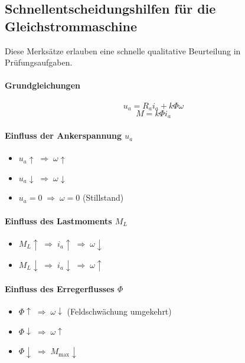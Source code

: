 \subsection{Schnellentscheidungshilfen für die Gleichstrommaschine}

Diese Merksätze erlauben eine schnelle qualitative Beurteilung in Prüfungsaufgaben.

\paragraph{Grundgleichungen}

\[
u_a = R_a i_a + k\Phi \omega
\]
\[
M = k\Phi i_a
\]

\paragraph{Einfluss der Ankerspannung $u_a$}

\begin{itemize}
\item $u_a \uparrow \;\Rightarrow\; \omega \uparrow$
\item $u_a \downarrow \;\Rightarrow\; \omega \downarrow$
\item $u_a = 0 \;\Rightarrow\; \omega = 0$ (Stillstand)
\end{itemize}

\paragraph{Einfluss des Lastmoments $M_L$}

\begin{itemize}
\item $M_L \uparrow \;\Rightarrow\; i_a \uparrow \;\Rightarrow\; \omega \downarrow$
\item $M_L \downarrow \;\Rightarrow\; i_a \downarrow \;\Rightarrow\; \omega \uparrow$
\end{itemize}

\paragraph{Einfluss des Erregerflusses $\Phi$}

\begin{itemize}
\item $\Phi \uparrow \;\Rightarrow\; \omega \downarrow$ (Feldschwächung umgekehrt)
\item $\Phi \downarrow \;\Rightarrow\; \omega \uparrow$
\item $\Phi \downarrow \;\Rightarrow\; M_{\max} \downarrow$
\end{itemize}

